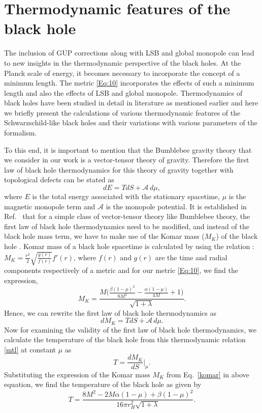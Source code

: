 \documentclass[aps,amsmath,amssymb,showpacs,showkeys]{revtex4}
\begin{document}
\section{Thermodynamic features of the black hole}
\label{sec3}
The inclusion of GUP corrections along with LSB and global monopole can lead 
to new insights in the thermodynamic perspective of the black holes. At the 
Planck scale of energy, it becomes necessary to incorporate the concept of a 
minimum length. The metric \eqref{Eq:10} incorporates the effects of such a 
minimum length and also the effects of LSB and global monopole. Thermodynamics 
of black holes have been studied in detail in literature as mentioned earlier 
and here we briefly present the calculations of various thermodynamic features 
of the Schwarzschild-like black holes and their variations with various parameters of the formalism.

 To this end, it is important to mention that the Bumblebee gravity 
theory that we consider in our work is a vector-tensor theory of gravity. 
Therefore the first law of black hole thermodynamics for this theory of gravity
together with topological defects can be stated as
\begin{equation}
dE = T dS + \mathcal{A}\, d\mu, 
\label{mt}
\end{equation}
where $E$ is the total energy associated with the stationary spacetime, 
$\mu $ is the magnetic monopole term and $\mathcal{A}$ is the monopole 
potential. It is established in Ref.\ \cite{ref5} that for a simple class of 
vector-tensor theory like Bumblebee theory, the first law of black hole 
thermodynamics need to be modified, and instead of the black hole mass term, 
we have to make use of the Komar mass ($M_K$) of the black hole 
\cite{ref6}. Komar mass of a black hole spacetime is calculated by using the 
relation \cite{ref6}: $M_K=\frac{r^2}{2}\sqrt{\frac{g(r)}{f(r)}}f'(r)$, 
where $f(r)$ and $g(r)$ are the time and radial components respectively of a 
metric and for our metric \eqref{Eq:10}, we find the expression,
\begin{equation}
 M_K=\frac{M \Big(\frac{\beta  (1-\mu )^2}{8 M^2}-\frac{\alpha  (1-\mu )}{4 M}+1\Big)}{\sqrt{1+\lambda }}.
\label{komar}
\end{equation}
Hence, we can rewrite the first law of black hole thermodynamics as 
\begin{equation}
    dM_K=TdS+\mathcal{A}\, d\mu.
    \label{mtl}
\end{equation}
Now for examining the validity of the first law of black hole thermodynamics, 
we calculate the temperature of the black hole from this thermodynamic 
relation \eqref{mtl} at constant $\mu$ as
\begin{equation}
T=\frac{d M_K}{dS}\Big|_{\mu}.
\end{equation}
Substituting the expression of the Komar mass $M_K$ from Eq.\ \eqref{komar} 
in above equation, we find the temperature of the black hole as given by
\begin{equation}
    T=\frac{8M^2 - 2M\alpha (1-\mu)+\beta(1-\mu)^2}{16\pi r_H^2 \sqrt{1+\lambda}}.
    \label{t1}
\end{equation}
\end{document}
